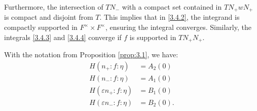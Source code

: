Furthermore, the intersection of $TN_{-}$ with a compact set contained in $TN_{+}wN_{+}$ is compact and disjoint from $T$. This implies that in \eqref{3.4.2}, the integrand is compactly supported in $F^\times \times F^\times$, ensuring the integral converges.
Similarly, the integrals \eqref{3.4.3} and \eqref{3.4.4} converge if $f$ is supported in $TN_{+}N_{+}$.
\begin{proposition}\label{prop:3.2}
With the notation from Proposition \ref{prop:3.1}, we have:
\begin{align}
    H(n_+:f:\eta) &= A_2(0) \label{3.4.6} \\
    H(n_-:f:\eta) &= A_1(0) \label{3.4.7} \\
    H(\varepsilon n_+:f:\eta) &= B_1(0)\label{3.4.8} \\
    H(\varepsilon n_-:f:\eta) &= B_2(0). \label{3.4.9}
\end{align}
\end{proposition}
